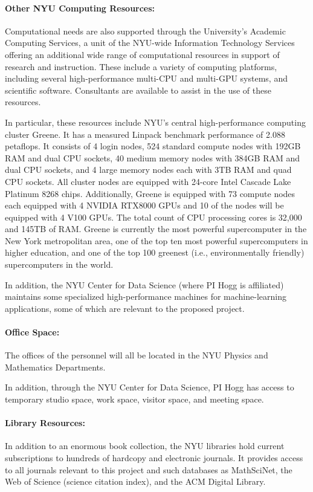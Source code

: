 \paragraph{Other NYU Computing Resources:}
Computational needs are also supported through the University's
Academic Computing Services, a unit of the NYU-wide Information
Technology Services offering an additional wide range of computational
resources in support of research and instruction.  These include a
variety of computing platforms, including several high-performance
multi-CPU and multi-GPU systems, and scientific software.  Consultants are available
to assist in the use of these resources.

In particular, these resources include NYU's central high-performance computing
cluster Greene. It has a measured Linpack benchmark performance of 2.088 petaflops. It
consists of 4 login nodes, 524 standard compute nodes with 192GB RAM and dual CPU sockets,
40 medium memory nodes with 384GB RAM and dual CPU sockets, and 4 large memory nodes
each with 3TB RAM and quad CPU sockets. All cluster nodes are equipped with 24-core Intel
Cascade Lake Platinum 8268 chips. Additionally, Greene is equipped with 73 compute nodes
each equipped with 4 NVIDIA RTX8000 GPUs and 10 of the nodes will be equipped with 4
V100 GPUs. The total count of CPU processing cores is 32,000 and 145TB of RAM.
Greene is currently the most powerful supercomputer in the New York metropolitan area, one of
the top ten most powerful supercomputers in higher education, and one of the top 100 greenest
(i.e., environmentally friendly) supercomputers in the world.

In addition, the NYU Center for Data Science (where PI Hogg is affiliated)
maintains some specialized high-performance machines for machine-learning
applications, some of which are relevant to the proposed project.

\paragraph{Office Space:}
The offices of the personnel will all be located in the NYU Physics and Mathematics Departments.

In addition, through the NYU Center for Data Science, PI Hogg has access to temporary studio space, work space, visitor space, and meeting space.

\paragraph{Library Resources:}
In addition to an enormous book collection, the NYU libraries hold
current subscriptions to hundreds of hardcopy and electronic journals.
It provides access to all journals relevant to this project and such
databases as MathSciNet, the Web of Science (science citation index),
and the ACM Digital Library.

